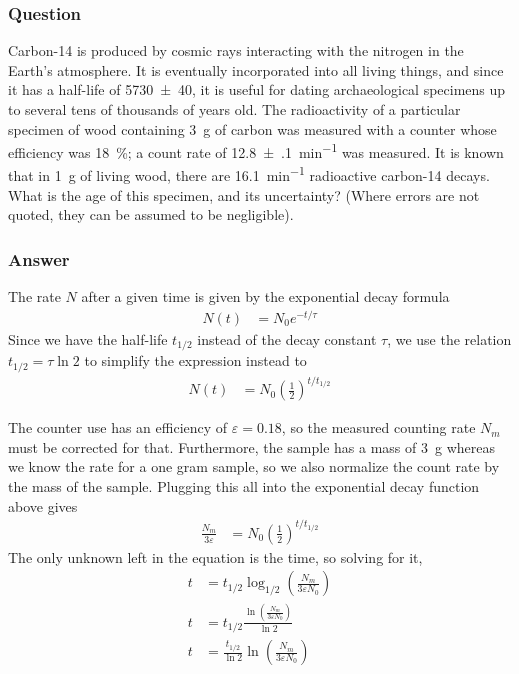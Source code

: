 \subsubsection{Question}
Carbon-14 is produced by cosmic rays interacting with the nitrogen in the
Earth's atmosphere. It is eventually incorporated into all living things,
and since it has a half-life of \SI{5730(40)}{\year}, it is useful for
dating archaeological specimens up to several tens of thousands of years
old. The radioactivity of a particular specimen of wood containing \SI{3}{\g}
of carbon was measured with a counter whose efficiency was
\SI{18}{\percent}; a count rate of \SI{12.8(1)}{\minute^{-1}} was measured.
It is known that in \SI{1}{\g} of living wood, there are
\SI{16.1}{\minute^{-1}} radioactive carbon-14 decays. What is the age of
this specimen, and its uncertainty? (Where errors are not quoted, they can
be assumed to be negligible).

\subsubsection{Answer}
The rate $N$ after a given time is given by the exponential decay formula
\begin{align*}
    N(t) &= N_0 e^{-t/\tau}
\end{align*}
Since we have the half-life $t_{1/2}$ instead of the decay constant $\tau$, we
use the relation $t_{1/2} = \tau\ln 2$ to simplify the expression instead to
\begin{align*}
    N(t) &= N_0 (\frac 12)^{t/t_{1/2}}
\end{align*}

The counter use has an efficiency of $\varepsilon  = 0.18$, so the measured counting
rate $N_m$ must be corrected for that. Furthermore, the sample has a mass of
\SI{3}{\g} whereas we know the rate for a one gram sample, so we also
normalize the count rate by the mass of the sample. Plugging this all into
the exponential decay function above gives
\begin{align*}
    \frac{N_m}{3\varepsilon } &= N_0 (\frac 12)^{t/t_{1/2}}
\end{align*}
The only unknown left in the equation is the time, so solving for it,
\begin{align*}
    t &= t_{1/2} \log_{1/2} (\frac{N_m}{3\varepsilon N_0}) \\
    t &= t_{1/2} \frac{\ln (\frac{N_m}{3\varepsilon N_0})}{\ln 2} \\
    t &= \frac{t_{1/2}}{\ln 2} \ln (\frac{N_m}{3\varepsilon N_0})
\end{align*}

